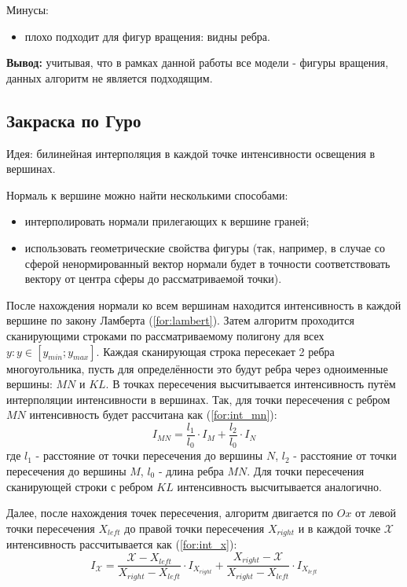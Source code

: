 Минусы:

\begin{itemize}
    \item плохо подходит для фигур вращения: видны ребра.
\end{itemize}

\textbf{Вывод:} учитывая, что в рамках данной работы все модели - фигуры вращения, данных алгоритм не является подходящим.

\subsection{Закраска по Гуро}
Идея: билинейная интерполяция в каждой точке интенсивности освещения в вершинах.

Нормаль к вершине можно найти несколькими способами:
\begin{itemize}
    \item интерполировать нормали прилегающих к вершине граней;
    \item использовать геометрические свойства фигуры (так, например, в случае со сферой ненормированный вектор нормали будет в точности соответствовать вектору от центра сферы до рассматриваемой точки).
\end{itemize}

После нахождения нормали ко всем вершинам находится интенсивность в каждой вершине по закону Ламберта (\ref{for:lambert}).
Затем алгоритм проходится сканирующими строками по рассматриваемому полигону для всех $y: y \in [y_{min}; y_{max}]$. Каждая сканирующая строка пересекает 2 ребра многоугольника, пусть для определённости это будут ребра через одноименные вершины: $MN$ и $KL$. В точках пересечения высчитывается интенсивность путём интерполяции интенсивности в вершинах. Так, для точки пересечения с ребром $MN$ интенсивность будет рассчитана как (\ref{for:int_mn}):
\begin{equation}
    \label{for:int_mn}
    I_{MN} = \frac{l_1}{l_0} \cdot I_M + \frac{l_2}{l_0} \cdot I_N
\end{equation}
где $l_1$ - расстояние от точки пересечения до вершины $N$, $l_2$ - расстояние от точки пересечения до вершины $M$, $l_0$ - длина ребра $MN$.
Для точки пересечения сканирующей строки с ребром $KL$ интенсивность высчитывается аналогично.

Далее, после нахождения точек пересечения, алгоритм двигается по $Ox$ от левой точки пересечения $X_{left}$ до правой точки пересечения $X_{right}$ и в каждой точке $\mathcal{X}$ интенсивность рассчитывается как (\ref{for:int_x}):
\begin{equation}
    \label{for:int_x}
    I_{\mathcal{X}} = \frac{\mathcal{X} - X_{left}}{X_{right} - X_{left}} \cdot I_{X_{right}} + \frac{X_{right} - \mathcal{X}}{X_{right} - X_{left}} \cdot I_{X_{left}}
\end{equation}

